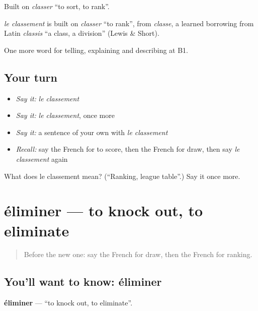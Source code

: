 Built on \emph{classer} \textquotedblleft{}to sort, to rank\textquotedblright{}.

\begin{cousinweb}
\emph{le classement} is built on \emph{classer} \textquotedblleft{}to rank\textquotedblright{}, from \emph{classe}, a learned borrowing from Latin \emph{classis} \textquotedblleft{}a class, a division\textquotedblright{} (Lewis \& Short).
\end{cousinweb}

\begin{grammarlens}[title={What you've built}]
One more word for telling, explaining and describing at B1.
\end{grammarlens}

\subsection*{Your turn}
\begin{itemize}
\raggedright
  \item \emph{Say it:} \emph{le classement}
  \item \emph{Say it:} \emph{le classement}, once more
  \item \emph{Say it:} a sentence of your own with \emph{le classement}
  \item \emph{Recall:} say the French for to score, then the French for draw, then say \emph{le classement} again
\end{itemize}

\begin{tcolorbox}[breakable,colback=teal!4,colframe=teal!35!black,title={Before you move on}]
What does le classement mean? (\textquotedblleft{}Ranking, league table\textquotedblright{}.) Say it once more.
\end{tcolorbox}
\section[éliminer]{éliminer — to knock out, to eliminate}

\label{lesson:FR-C506-eliminer}



\begin{quote}
Before the new one: say the French for draw, then the French for ranking.
\end{quote}

\subsection*{You'll want to know: éliminer}
\textbf{éliminer} — \textquotedblleft{}to knock out, to eliminate\textquotedblright{}.

